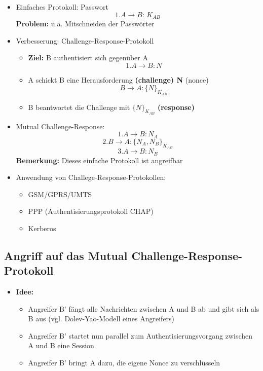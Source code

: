 \documentclass[openany]{book}
\begin{document}
\begin{itemize}
    \item Einfaches Protokoll: Passwort $$1.A\rightarrow B:\, K_{AB}$$ \textbf{Problem:} u.a. Mitschneiden der Passwörter
    \item Verbesserung: Challenge-Response-Protokoll
    \begin{itemize}
        \item \textbf{Ziel:} B authentisiert sich gegenüber A $$1.A\rightarrow B:N$$
        \item A schickt B eine Herausforderung \textbf{(challenge) N} (nonce) $$B\rightarrow A:\{ N\}_{K_{AB}}$$
        \item B beantwortet die Challenge mit $\{ N\}_{K_{AB}}$ \textbf{(response)}
    \end{itemize}
    \item Mutual Challenge-Response: $$1.A\rightarrow B:N_A$$ $$2.B\rightarrow A:\{ N_A,N_B\}_{K_{AB}}$$ $$3.A\rightarrow B:N_B$$ \textbf{Bemerkung:} Dieses einfache Protokoll ist angreifbar
    \item Anwendung von Challege-Response-Protokollen:
    \begin{itemize}
        \item GSM/GPRS/UMTS
        \item PPP (Authentisierungsprotokoll CHAP)
        \item Kerberos
    \end{itemize} 
\end{itemize}

\subsection{Angriff auf das Mutual Challenge-Response-Protokoll}

\begin{itemize}
    \item \textbf{Idee:}
    \begin{itemize}
        \item Angreifer B' fängt alle Nachrichten zwischen A und B ab und gibt sich als B aus (vgl. Dolev-Yao-Modell eines Angreifers)
        \item Angreifer B' startet nun parallel zum Authentisierungsvorgang zwischen A und B eine Session
        \item Angreifer B' bringt A dazu, die eigene Nonce zu verschlüsseln
    \end{itemize}
\end{itemize}
\end{document}
